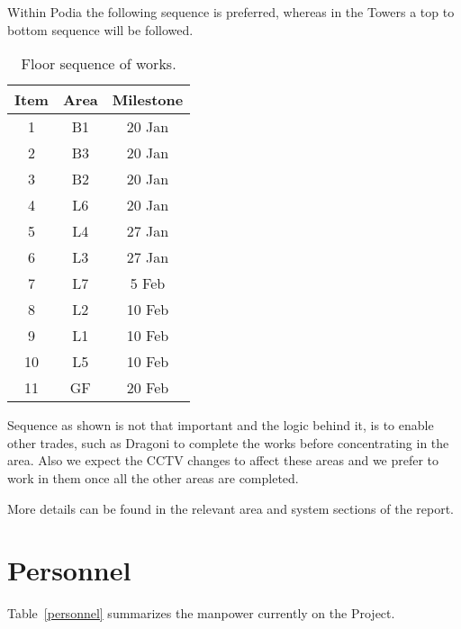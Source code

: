 Within Podia the following sequence is preferred, whereas in the Towers a top to bottom sequence will be followed.

\begin{table}[htbp]
\centering
\begin{tabular}{ccc}
\toprule
Item  &Area   & Milestone \\
\midrule
1     & B1 & 20 Jan\\
2     & B3 & 20 Jan \\
3     & B2 & 20 Jan \\
4     & L6 & 20 Jan\\
5     & L4 & 27 Jan\\
6     & L3 & 27 Jan\\
7     & L7 &  5 Feb\\
8     & L2 & 10 Feb\\
9     & L1 & 10 Feb\\
10    & L5 & 10 Feb\\
11    & GF & 20 Feb\\
\bottomrule
\end{tabular}
\caption{Floor sequence of works.}
\end{table}

Sequence as shown is not that important and the logic behind it, is to enable other trades, such as Dragoni to complete the
works before concentrating in the area. Also we expect the CCTV
changes to affect these areas and we prefer to work in them
once all the other areas are completed.

More details can be found in the relevant area and system sections of the report.


\section*{Personnel}


 Table~\ref{personnel} summarizes the manpower currently on the Project. 

